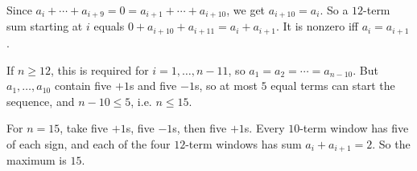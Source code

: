 Since $a_i+\cdots+a_{i+9}=0=a_{i+1}+\cdots+a_{i+10}$, we get $a_{i+10}=a_i$. So a $12$-term sum starting at $i$ equals $0+a_{i+10}+a_{i+11}=a_i+a_{i+1}$. It is nonzero iff $a_i=a_{i+1}$.

If $n\ge12$, this is required for $i=1,\dots,n-11$, so $a_1=a_2=\cdots=a_{n-10}$. But $a_1,\dots,a_{10}$ contain five $+1$s and five $-1$s, so at most $5$ equal terms can start the sequence, and $n-10\le5$, i.e. $n\le15$.

For $n=15$, take five $+1$s, five $-1$s, then five $+1$s. Every $10$-term window has five of each sign, and each of the four $12$-term windows has sum $a_i+a_{i+1}=2$. So the maximum is $\boxed{15}$.
